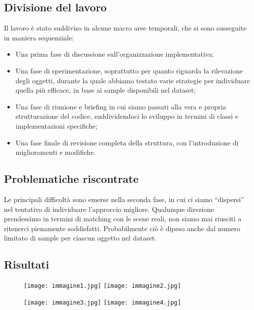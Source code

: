 \documentclass{article}
\begin{document}
\subsection*{Divisione del lavoro}
Il lavoro è stato  suddiviso in alcune macro aree temporali, che si sono susseguite in maniera sequenziale:
\begin{itemize}
    \item Una prima fase di discussione sull’organizzazione implementativa;
    \item Una fase di sperimentazione, soprattutto per quanto riguarda la rilevazione degli oggetti, durante la quale abbiamo testato varie strategie per individuare quella più efficace, in base ai sample disponibili nel dataset;
    \item Una fase di riunione e briefing in cui siamo passati alla vera e propria strutturazione del codice, suddividendoci lo sviluppo in termini di classi e implementazioni specifiche;
    \item Una fase finale di revisione completa della struttura, con l’introduzione di miglioramenti e modifiche.
\end{itemize}

\subsection*{Problematiche riscontrate}
Le principali difficoltà sono emerse nella seconda fase, in cui ci siamo “dispersi” nel tentativo di individuare l’approccio migliore. Qualunque direzione prendessimo in termini di matching con le scene reali, non siamo mai riusciti a ritenerci pienamente soddisfatti. Probabilmente ciò è dipeso anche dal numero limitato di sample per ciascun oggetto nel dataset.

\subsection*{Risultati}



 


\begin{figure}[H]
  \centering
  \texttt{[image: immagine1.jpg]} %
  \hfill
  \texttt{[image: immagine2.jpg]} %
\end{figure}

\begin{figure}[H]
  \centering
  \texttt{[image: immagine3.jpg]}
  \hfill
  \texttt{[image: immagine4.jpg]}
\end{figure}
\end{document}
